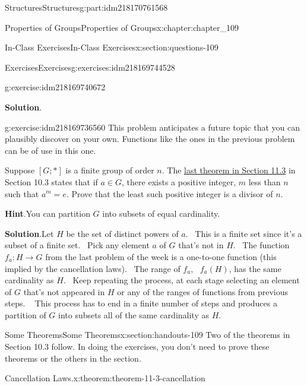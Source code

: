 \documentclass[oneside,10pt,]{book}
\newcommand{\blocktitlefont}{\relax}
\numberwithin{equation}{section}
\begin{document}
\begin{partptx}{Structures}{}{Structures}{}{}{g:part:idm218170761568}
\begin{chapterptx}{Properties of Groups}{}{Properties of Groups}{}{}{x:chapter:chapter_109}
\begin{sectionptx}{In-Class Exercises}{}{In-Class Exercises}{}{}{x:section:questions-109}
\begin{exercises-subsection-numberless}{Exercises}{}{Exercises}{}{}{g:exercises:idm218169744528}
\begin{exercisegroup}
\begin{divisionexerciseeg}{2}{}{}{g:exercise:idm218169740672}
\par\smallskip%
\noindent\textbf{\blocktitlefont Solution}.\hypertarget{g:solution:idm218169740288}{}\quad{}%
\end{divisionexerciseeg}%
\begin{divisionexerciseeg}{3}{}{}{g:exercise:idm218169736560}%
This problem anticipates a future topic that you can plausibly discover on your own. Functions like the ones in the previous problem can be of use in this one.%
\par
Suppose \([G;*]\) is a finite group of order \(n\). The \hyperref[x:theorem:theorem-11-3-finite]{last theorem in Section 11.3} in Section 10.3 states that if \(a\in G\), there exists a positive integer, \(m\) less than \(n\) such that \(a^m=e\).  Prove that the least such positive integer is a divisor of \(n\).%
\par\smallskip%
\noindent\textbf{\blocktitlefont Hint}.\hypertarget{g:hint:idm218169735760}{}\quad{}You can partition \(G\) into subsets of equal cardinality.%
\par\smallskip%
\noindent\textbf{\blocktitlefont Solution}.\hypertarget{g:solution:idm218169730864}{}\quad{}Let \(H\) be the set of distinct powers of \(a\).  This is a finite set since it's a subset of a finite set.  Pick any element \(a\) of \(G\) that's not in \(H\).  The function \(f_a:H \rightarrow G\) from the last problem of the week is a one-to-one function (this implied by the cancellation laws).  The range of \(f_a\),  \(f_a(H)\), has the same cardinality as \(H\).  Keep repeating the process, at each stage selecting an element of \(G\) that's not appeared in \(H\) or any of the ranges of functions from previous steps.   This process has to end in a finite number of steps and produces a partition of \(G\) into subsets all of the same cardinality as \(H\).%
\end{divisionexerciseeg}%
\end{exercisegroup}
\par\medskip\noindent
\end{exercises-subsection-numberless}
\end{sectionptx}
%
%
\typeout{************************************************}
\typeout{************************************************}
%
\begin{sectionptx}{Some Theorems}{}{Some Theorems}{}{}{x:section:handouts-109}
Two of the theorems in Section 10.3 follow. In doing the exercises, you don't need to prove these theorems or the others in the section.%
\begin{theorem}{Cancellation Laws.}{}{x:theorem:theorem-11-3-cancellation}%

\end{theorem}
\end{sectionptx}
\end{chapterptx}
\end{partptx}
\end{document}
